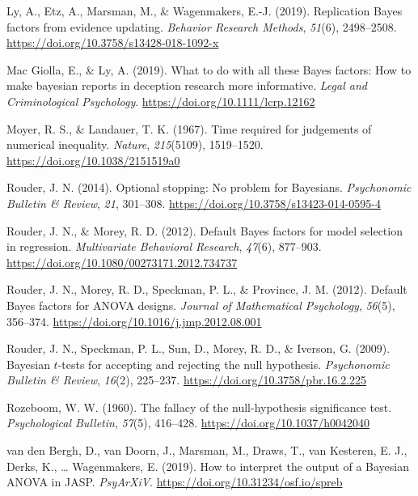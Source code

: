\documentclass[english,,doc,floatsintext]{apa6}
\begin{document}
\leavevmode\hypertarget{ref-ly2019replication}{}%
Ly, A., Etz, A., Marsman, M., \& Wagenmakers, E.-J. (2019). Replication Bayes factors from evidence updating. \emph{Behavior Research Methods}, \emph{51}(6), 2498--2508. \url{https://doi.org/10.3758/s13428-018-1092-x}

\leavevmode\hypertarget{ref-giollaInpresswhat}{}%
Mac Giolla, E., \& Ly, A. (2019). What to do with all these Bayes factors: How to make bayesian reports in deception research more informative. \emph{Legal and Criminological Psychology}. \url{https://doi.org/10.1111/lcrp.12162}

\leavevmode\hypertarget{ref-moyer1967}{}%
Moyer, R. S., \& Landauer, T. K. (1967). Time required for judgements of numerical inequality. \emph{Nature}, \emph{215}(5109), 1519--1520. \url{https://doi.org/10.1038/2151519a0}

\leavevmode\hypertarget{ref-rouder2014optional}{}%
Rouder, J. N. (2014). Optional stopping: No problem for Bayesians. \emph{Psychonomic Bulletin \& Review}, \emph{21}, 301--308. \url{https://doi.org/10.3758/s13423-014-0595-4}

\leavevmode\hypertarget{ref-rouder2012defaultRegression}{}%
Rouder, J. N., \& Morey, R. D. (2012). Default Bayes factors for model selection in regression. \emph{Multivariate Behavioral Research}, \emph{47}(6), 877--903. \url{https://doi.org/10.1080/00273171.2012.734737}

\leavevmode\hypertarget{ref-rouder2012defaultAnova}{}%
Rouder, J. N., Morey, R. D., Speckman, P. L., \& Province, J. M. (2012). Default Bayes factors for ANOVA designs. \emph{Journal of Mathematical Psychology}, \emph{56}(5), 356--374. \url{https://doi.org/10.1016/j.jmp.2012.08.001}

\leavevmode\hypertarget{ref-rouder2009bayesian}{}%
Rouder, J. N., Speckman, P. L., Sun, D., Morey, R. D., \& Iverson, G. (2009). Bayesian \(t\)-tests for accepting and rejecting the null hypothesis. \emph{Psychonomic Bulletin \& Review}, \emph{16}(2), 225--237. \url{https://doi.org/10.3758/pbr.16.2.225}

\leavevmode\hypertarget{ref-rozeboom1960}{}%
Rozeboom, W. W. (1960). The fallacy of the null-hypothesis significance test. \emph{Psychological Bulletin}, \emph{57}(5), 416--428. \url{https://doi.org/10.1037/h0042040}

\leavevmode\hypertarget{ref-vandenbergh2019how}{}%
van den Bergh, D., van Doorn, J., Marsman, M., Draws, T., van Kesteren, E. J., Derks, K., \ldots{} Wagenmakers, E. (2019). How to interpret the output of a Bayesian ANOVA in JASP. \emph{PsyArXiV}. \url{https://doi.org/10.31234/osf.io/spreb}
\end{document}
